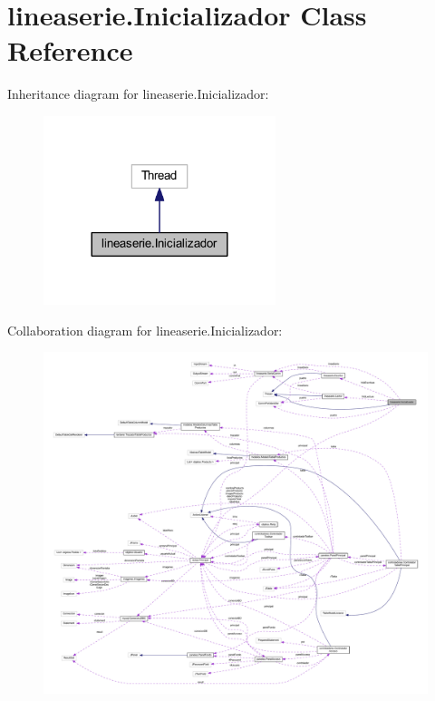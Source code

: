 \hypertarget{classlineaserie_1_1_inicializador}{}\section{lineaserie.\+Inicializador Class Reference}
\label{classlineaserie_1_1_inicializador}


Inheritance diagram for lineaserie.\+Inicializador\+:
\nopagebreak
\begin{figure}[H]
\begin{center}
\leavevmode
\includegraphics[width=192pt]{classlineaserie_1_1_inicializador__inherit__graph}
\end{center}
\end{figure}


Collaboration diagram for lineaserie.\+Inicializador\+:
\nopagebreak
\begin{figure}[H]
\begin{center}
\leavevmode
\includegraphics[width=350pt]{classlineaserie_1_1_inicializador__coll__graph}
\end{center}
\end{figure}
